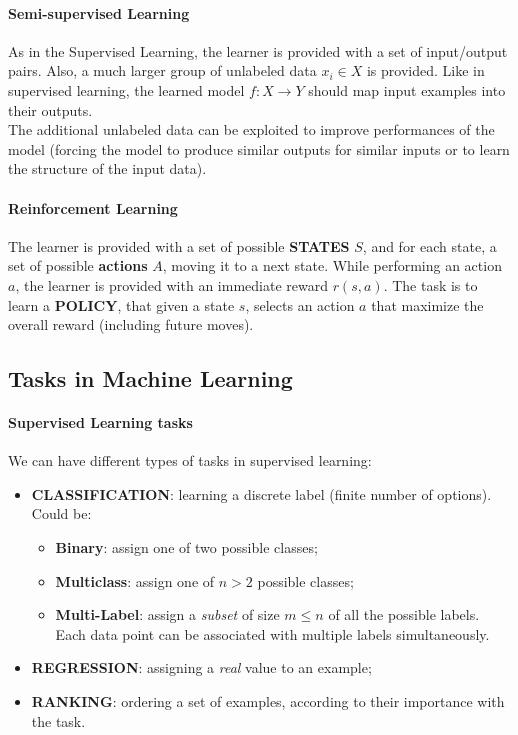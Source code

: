 \paragraph{Semi-supervised Learning}
As in the Supervised Learning, the learner is provided with a set of input/output pairs. 
Also, a much larger group of unlabeled data $x_i \in X$ is provided. 
Like in supervised learning, the learned model $f: X\rightarrow Y$ should map input examples into their outputs.
\\The additional unlabeled data can be exploited to improve performances of the model (forcing the model to produce similar outputs for similar inputs or to learn the structure of the input data).

\paragraph{Reinforcement Learning} 
The learner is provided with a set of possible \textbf{STATES} $S$, and for each state, a set of possible \textbf{actions} $A$, moving it to a next state.
While performing an action $a$, the learner is provided with an immediate reward $r(s,a)$.
The task is to learn a \textbf{POLICY}, that given a state $s$, selects an action $a$ that maximize the overall reward (including future moves).

\subsection{Tasks in Machine Learning}
\paragraph{Supervised Learning tasks}
We can have different types of tasks in supervised learning:
\begin{itemize}
    \item \textbf{CLASSIFICATION}: learning a discrete label (finite number of options). Could be:
    \begin{itemize}
        \item \textbf{Binary}: assign one of two possible classes;
        \item \textbf{Multiclass}: assign one of $n > 2$ possible classes;
        \item \textbf{Multi-Label}: assign a \textit{subset} of size $m \le n$ of all the possible labels. 
        Each data point can be associated with multiple labels simultaneously.
    \end{itemize}
    \item \textbf{REGRESSION}: assigning a \textit{real} value to an example;
    \item \textbf{RANKING}: ordering a set of examples, according to their importance with the task.
\end{itemize}

